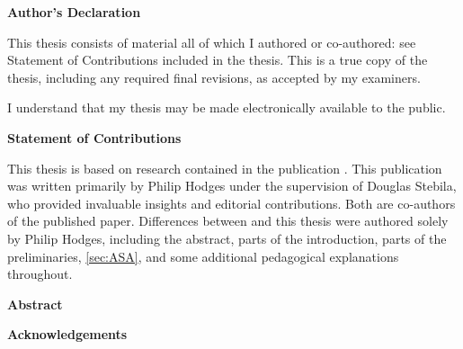 \cleardoublepage %

 \begin{center}\textbf{Author's Declaration}\end{center}
  
 \noindent
This thesis consists of material all of which I authored or co-authored: see Statement of Contributions included in the thesis. This is a true copy of the thesis, including any required final revisions, as accepted by my examiners.
  \bigskip
  
  \noindent
I understand that my thesis may be made electronically available to the public.

\cleardoublepage


 \begin{center}\textbf{Statement of Contributions}\end{center}
 
 \noindent
This thesis is based on research contained in the publication \cite{TOSC:HodSte21}. This publication was written primarily by Philip Hodges under the supervision of Douglas Stebila, who provided invaluable insights and editorial contributions. Both are co-authors of the published paper. Differences between \cite{TOSC:HodSte21} and this thesis were authored solely by Philip Hodges, including the abstract, parts of the introduction, parts of the preliminaries, \autoref{sec:ASA}, and some additional pedagogical explanations throughout.


\cleardoublepage


\begin{center}\textbf{Abstract}\end{center}



\cleardoublepage


\begin{center}\textbf{Acknowledgements}\end{center}

